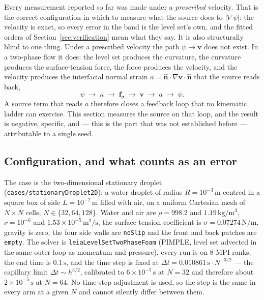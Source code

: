 \documentclass[preprint,3p,11pt]{elsarticle}
\newcommand{\psilev}{\psi}
\newcommand{\nhat}{\hat{\mathbf{n}}}
\newcommand{\gradpsi}{\lvert\nabla\psilev\rvert}
\begin{document}
Every measurement reported so far was made under a \emph{prescribed} velocity.
That is the correct configuration in which to measure what the source does to
$\gradpsi$: the velocity is exact, so every error in the band is the level set's
own, and the fitted orders of Section~\ref{sec:verification} mean what they say.
It is also structurally blind to one thing. Under a prescribed velocity the path
$\psilev \rightarrow \mathbf{v}$ does not exist. In a two-phase flow it does: the
level set produces the curvature, the curvature produces the surface-tension
force, the force produces the velocity, and the velocity produces the interfacial
normal strain $a = \nhat\cdot\nabla\mathbf{v}\cdot\nhat$ that the source reads
back,
\begin{equation}
  \psilev \;\longrightarrow\; \kappa \;\longrightarrow\; \mathbf{f}_\sigma
  \;\longrightarrow\; \mathbf{v} \;\longrightarrow\; a \;\longrightarrow\; \psilev .
  \label{eq:capillaryloop}
\end{equation}
A source term that reads $a$ therefore closes a feedback loop that no kinematic
ladder can exercise. This section measures the source on that loop, and the
result is negative, specific, and --- this is the part that was not established
before --- attributable to a single seed.

\subsection{Configuration, and what counts as an error}
\label{sec:coupled-setup}

The case is the two-dimensional stationary droplet
(\texttt{cases/stationaryDroplet2D}): a water droplet of radius
$R = 10^{-3}\,\mathrm{m}$ centred in a square box of side
$L = 10^{-2}\,\mathrm{m}$ filled with air, on a uniform Cartesian mesh of
$N \times N$ cells, $N \in \{32, 64, 128\}$. Water and air are
$\rho = 998.2$ and $1.19\,\mathrm{kg/m^3}$, $\nu = 10^{-6}$ and
$1.53\times10^{-5}\,\mathrm{m^2/s}$, the surface-tension coefficient is
$\sigma = 0.07274\,\mathrm{N/m}$, gravity is zero, the four side walls are
\texttt{noSlip} and the front and back patches are \texttt{empty}. The solver is
\texttt{leiaLevelSetTwoPhaseFoam} (PIMPLE, level set advected in the same outer
loop as momentum and pressure), every run is on $8$ MPI ranks, the end time is
$0.1\,\mathrm{s}$, and the time step is fixed at
$\Delta t = 0.010861\,\mathrm{s} \cdot N^{-3/2}$ --- the capillary limit
$\Delta t \sim h^{3/2}$, calibrated to $6\times10^{-5}\,\mathrm{s}$ at $N=32$ and
therefore about $2\times10^{-5}\,\mathrm{s}$ at $N=64$. No time-step adjustment
is used, so the step is the same in every arm at a given $N$ and cannot silently
differ between them.
\end{document}
